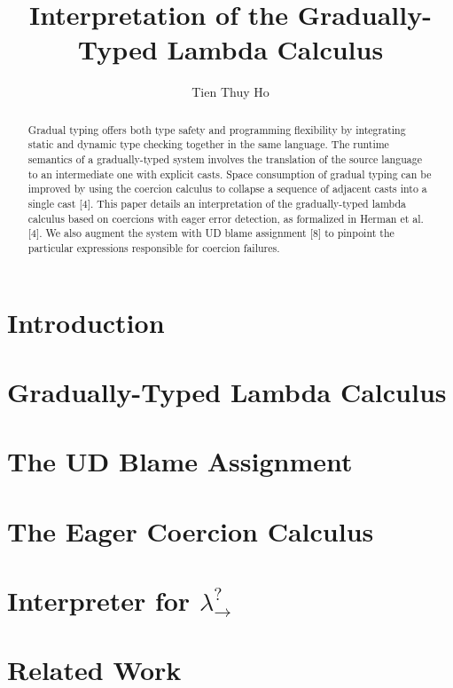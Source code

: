 \documentclass[11pt]{article}
\title{\bf Interpretation of the Gradually-Typed Lambda Calculus}
\author{Tien Thuy Ho}
\begin{document}




\setcounter{page}{3}
\tableofcontents
\listoffigures

\maketitle
{}

\begin{abstract}
Gradual typing offers both type safety and programming flexibility by integrating static and dynamic type checking 
together in the same language. The runtime semantics of a gradually-typed system involves the translation of the 
source language to an intermediate one with explicit casts. Space consumption of gradual typing can be improved by using 
the coercion calculus to collapse a sequence of adjacent casts into a single cast [4]. This paper details an 
interpretation of the gradually-typed lambda calculus based on coercions with eager error detection, as formalized  
in Herman et al. [4]. We also augment the system with UD blame assignment [8] to pinpoint the particular expressions 
responsible for coercion failures.
\end{abstract}

\section{Introduction} 
\section{Gradually-Typed Lambda Calculus} 
\section{The UD Blame Assignment} 
\section{The Eager Coercion Calculus} 
\section{Interpreter for $\lambda ^? _{\rightarrow}$} 
\section{Related Work} 
\end{document}
